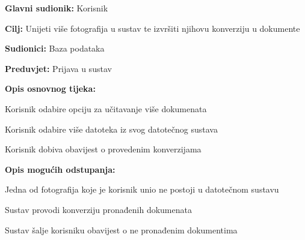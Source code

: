 				\noindent {}
				\begin{packed_item}
					
					\item \textbf{Glavni sudionik: }Korisnik
					\item  \textbf{Cilj:} Unijeti više fotografija u sustav te izvršiti njihovu konverziju u dokumente
					\item  \textbf{Sudionici:} Baza podataka
					\item  \textbf{Preduvjet:} Prijava u sustav
					\item  \textbf{Opis osnovnog tijeka:}
					
					\item[] \begin{packed_enum}
						
						\item Korisnik odabire opciju za učitavanje više dokumenata
						\item Korisnik odabire više datoteka iz svog datotečnog sustava
						\item Korisnik dobiva obavijest o provedenim konverzijama
					
					\end{packed_enum}
					
					\item  \textbf{Opis mogućih odstupanja:}
					
					\item[] \begin{packed_item}
						
						\item[2.a] Jedna od fotografija koje je korisnik unio ne postoji u datotečnom sustavu
						\item[] \begin{packed_enum}
							
							\item Sustav provodi konverziju pronađenih dokumenata
							\item Sustav šalje korisniku obavijest o ne pronađenim dokumentima
							
						\end{packed_enum}
					\end{packed_item}
				\end{packed_item}
			
